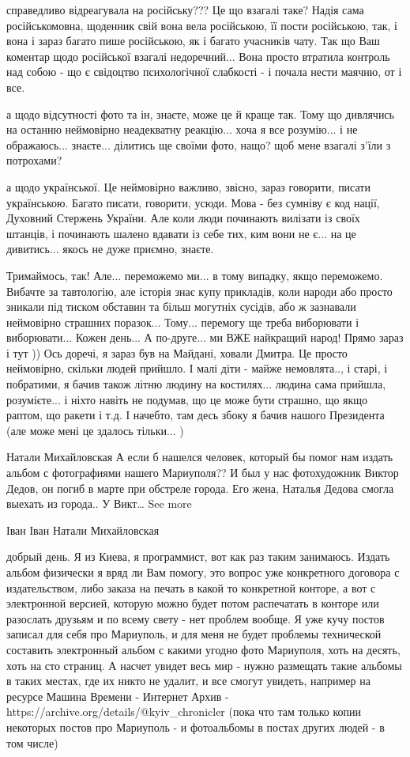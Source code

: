 справедливо відреагувала на російську??? Це що взагалі таке? Надія сама
російськомовна, щоденник свій вона вела російською, її пости російською, так, і
вона і зараз багато пише російською, як і багато учасників чату. Так що Ваш
коментар щодо російської взагалі недоречний... Вона просто втратила контроль
над собою - що є свідоцтво психологічної слабкості - і почала нести маячню, от
і все.

а щодо відсутності фото та ін, знаєте, може це й краще так. Тому що дивлячись
на останню неймовірно неадекватну реакцію... хоча я все розумію... і не
ображаюсь... знаєте... ділитись ще своїми фото, нащо? щоб мене взагалі з'їли з
потрохами?

а щодо української. Це неймовірно важливо, звісно, зараз говорити, писати
українською. Багато писати, говорити, усюди. Мова - без сумніву є код нації,
Духовний Стержень України. Але коли люди починають вилізати із своїх штанців, і
починають шалено вдавати із себе тих, ким вони не є... на це дивитись... якось
не дуже приємно, знаєте.

Тримаймось, так! Але... переможемо ми... в тому випадку, якщо переможемо.
Вибачте за тавтологію, але історія знає купу прикладів, коли народи або просто
зникали під тиском обставин та більш могутніх сусідів, або ж зазнавали
неймовірно страшних поразок... Тому... перемогу ще треба виборювати і
виборювати...  Кожен день... А по-друге... ми ВЖЕ найкращий народ! Прямо зараз
і тут )) Ось доречі, я зараз був на Майдані, ховали Дмитра. Це просто
неймовірно, скільки людей прийшло. І малі діти - майже немовлята.., і старі, і
побратими, я бачив також літню людину на костилях... людина сама прийшла,
розумієте... і ніхто навіть не подумав, що це може бути страшно, що якщо
раптом, що ракети і т.д. І начебто, там десь збоку я бачив нашого Президента
(але може мені це здалось тільки... )

Натали Михайловская
А если б нашелся человек, который бы помог нам издать альбом с фотографиями нашего Мариуполя?? И был у нас фотохудожник Виктор Дедов, он погиб в марте при обстреле города. Его жена, Наталья Дедова смогла выехать из города.. У Викт… See more

Іван Іван
Натали Михайловская 

добрый день. Я из Киева, я программист, вот как раз таким занимаюсь. Издать
альбом физически я вряд ли Вам помогу, это вопрос уже конкретного договора с
издательством, либо заказа на печать в какой то конкретной конторе, а вот с
электронной версией, которую можно будет потом распечатать в конторе или
разослать друзьям и по всему свету - нет проблем вообще. Я уже кучу постов
записал для себя про Мариуполь, и для меня не будет проблемы технической
составить электронный альбом с какими угодно фото Мариуполя, хоть на десять,
хоть на сто страниц. А насчет увидет весь мир - нужно размещать такие альбомы в
таких местах, где их никто не удалит, и все смогут увидеть, например на ресурсе
Машина Времени - Интернет Архив - https://archive.org/details/@kyiv_chronicler
(пока что там только копии некоторых постов про Мариуполь - и фотоальбомы в
постах других людей - в том числе)

